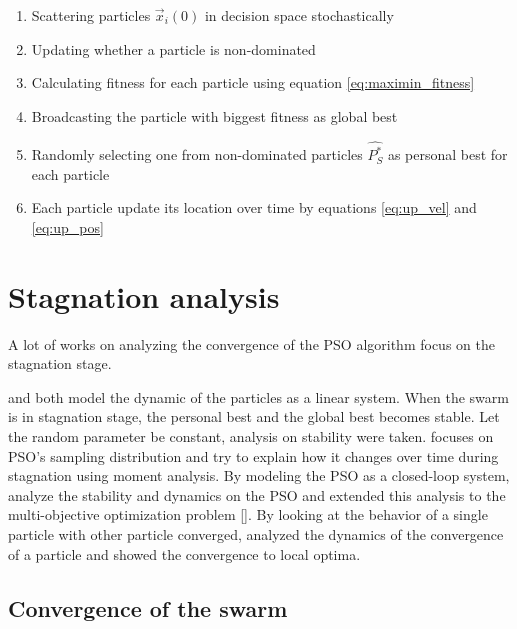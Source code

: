 \documentclass[12pt]{article}
\begin{document}
\begin{enumerate}
\item Scattering particles $ \vec{x}_{i}(0) $ in decision space stochastically
\item Updating whether a particle is non-dominated 
\item Calculating fitness for each particle using equation \eqref{eq:maximin_fitness}
\item Broadcasting the particle with biggest fitness as global best
\item Randomly selecting one from non-dominated particles $ \hat{P^{*}_{S}} $ as personal best for each particle
\item Each particle update its location over time by equations \eqref{eq:up_vel} and \eqref{eq:up_pos}
\end{enumerate}

\section{Stagnation analysis}

A lot of works on analyzing the convergence of the PSO algorithm focus on the stagnation stage.


\cite{trelea2003particle} and \cite{clerc2002particle} both model the dynamic of the particles as a linear system. 
When the swarm is in stagnation stage, the personal best and the global best becomes stable. 
Let the random parameter be constant, analysis on stability were taken.
\cite{poli2008dynamics} focuses on PSO's sampling distribution and try to explain how it changes over time during stagnation using moment analysis.
By modeling the PSO as a closed-loop system, \cite{samal2007closed} analyze the stability and dynamics on the PSO and extended this analysis to the multi-objective optimization problem [\cite{chakraborty2011convergence}].
By looking at the behavior of a single particle with other particle converged, \cite{schmitt2013particle} analyzed the dynamics of the convergence of a particle and showed the convergence to local optima.

\subsection{Convergence of the swarm}
\end{document}

